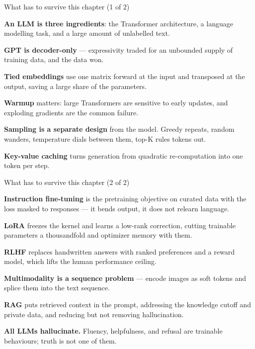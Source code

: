 \documentclass[aspectratio=169,11pt,t]{beamer}
\begin{document}
\begin{frame}[shrink=25]{What has to survive this chapter (1 of 2)}
\begin{isteps}
\item \textbf{An LLM is three ingredients}: the Transformer architecture, a language modelling task, and a large amount of unlabelled text.
\item \textbf{GPT is decoder-only} --- expressivity traded for an unbounded supply of training data, and the data won.
\item \textbf{Tied embeddings} use one matrix forward at the input and transposed at the output, saving a large share of the parameters.
\item \textbf{Warmup} matters: large Transformers are sensitive to early updates, and exploding gradients are the common failure.
\item \textbf{Sampling is a separate design} from the model. Greedy repeats, random wanders, temperature dials between them, top-K rules tokens out.
\item \textbf{Key-value caching} turns generation from quadratic re-computation into one token per step.
\end{isteps}
\end{frame}

\begin{frame}[shrink=25]{What has to survive this chapter (2 of 2)}
\begin{isteps}
\item \textbf{Instruction fine-tuning} is the pretraining objective on curated data with the loss masked to responses --- it bends output, it does not relearn language.
\item \textbf{LoRA} freezes the kernel and learns a low-rank correction, cutting trainable parameters a thousandfold and optimizer memory with them.
\item \textbf{RLHF} replaces handwritten answers with ranked preferences and a reward model, which lifts the human performance ceiling.
\item \textbf{Multimodality is a sequence problem} --- encode images as soft tokens and splice them into the text sequence.
\item \textbf{RAG} puts retrieved context in the prompt, addressing the knowledge cutoff and private data, and reducing but not removing hallucination.
\item \textbf{All LLMs hallucinate.} Fluency, helpfulness, and refusal are trainable behaviours; truth is not one of them.
\end{isteps}
\vskip 4pt
\vskip 2pt
\end{frame}
\end{document}
